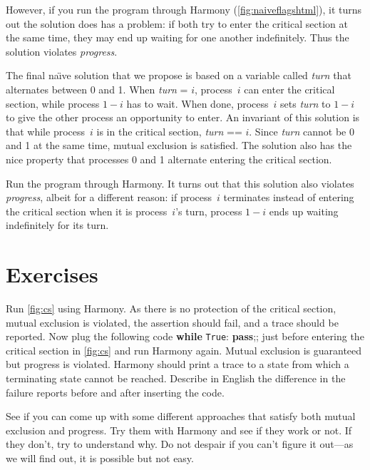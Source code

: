 \documentclass{report}
\begin{document}
However, if you run the program through Harmony (\autoref{fig:naiveflagshtml}),
it turns out the solution
does has a problem: if both try to enter the critical section at the same
time, they may end up waiting for one another indefinitely.  Thus the
solution violates \emph{progress}.

The final na\"{\i}ve solution that we propose
is based on a variable called \textit{turn}
that alternates between 0 and 1.  When \textit{turn} = $i$, process~$i$ can
enter the critical section, while process $1-i$ has to wait.  When done,
process~$i$ sets \textit{turn} to $1-i$ to give the other process an
opportunity to enter.
An invariant of this solution is that while process~$i$ is in the critical
section, \textit{turn} == $i$.
Since \textit{turn} cannot be 0 and 1 at
the same time, mutual exclusion is satisfied.
The solution also has the nice property that
processes 0 and 1 alternate entering the critical section.

Run the program through Harmony.  It turns out that this solution also violates
\emph{progress}, albeit for a different reason:
if process~$i$ terminates instead of entering the critical section when it
is process~$i$'s turn, process $1-i$ ends up waiting indefinitely for its
turn.

\section*{Exercises}
\begin{problems}
\item Run \autoref{fig:cs} using Harmony.  As there is no protection of the critical
section, mutual exclusion is violated,
the assertion should fail, and a trace should be reported.
Now plug the following code \textbf{while} \texttt{True}: \textbf{pass};;
just before entering the critical section
in \autoref{fig:cs} and run Harmony again.
Mutual exclusion is guaranteed but progress is violated.
Harmony should print a trace
to a state from which a terminating state cannot be reached.
Describe in English the difference in the failure reports before
and after inserting the code.
\item See if you can come up with some different approaches that satisfy both
mutual exclusion and progress.  Try them with Harmony and see if they work or not.
If they don't, try to understand why.
Do not despair if you can't figure it out---as
we will find out, it is possible but not easy.
\end{problems}
\end{document}

